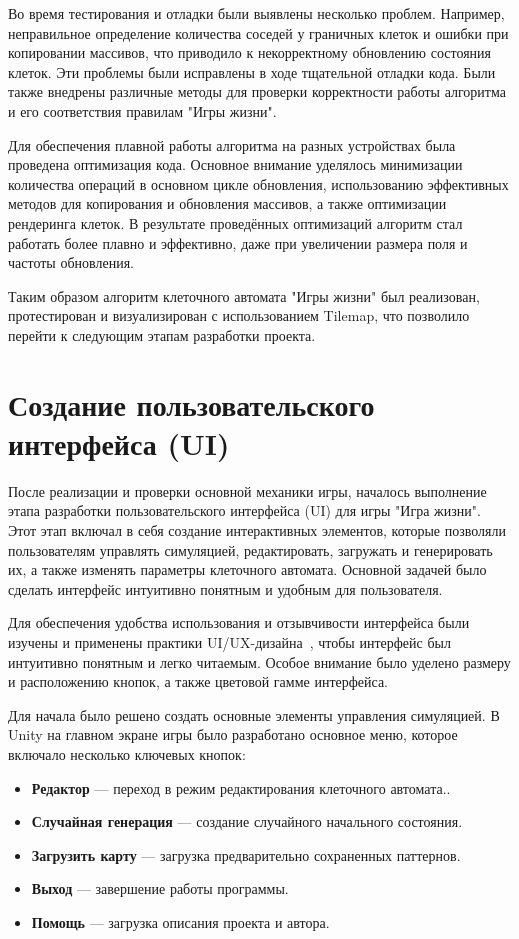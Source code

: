 Во время тестирования и отладки были выявлены несколько проблем. Например, неправильное определение количества соседей у граничных клеток и ошибки при копировании массивов, что приводило к некорректному обновлению состояния клеток. Эти проблемы были исправлены в ходе тщательной отладки кода. Были также внедрены различные методы для проверки корректности работы алгоритма и его соответствия правилам "Игры жизни".

Для обеспечения плавной работы алгоритма на разных устройствах была проведена оптимизация кода. Основное внимание уделялось минимизации количества операций в основном цикле обновления, использованию эффективных методов для копирования и обновления массивов, а также оптимизации рендеринга клеток. В результате проведённых оптимизаций алгоритм стал работать более плавно и эффективно, даже при увеличении размера поля и частоты обновления.

Таким образом алгоритм клеточного автомата "Игры жизни" был реализован, протестирован и визуализирован с использованием Tilemap, что позволило перейти к следующим этапам разработки проекта.

\section{\label{sec:ch02/sec01/sub03}Создание пользовательского интерфейса (UI)}

После реализации и проверки основной механики игры, началось выполнение этапа разработки пользовательского интерфейса (UI) для игры "Игра жизни". 
Этот этап включал в себя создание интерактивных элементов, которые позволяли пользователям управлять симуляцией, редактировать, загружать и генерировать их, а также изменять параметры клеточного автомата. Основной задачей было сделать интерфейс интуитивно понятным и удобным для пользователя.

Для обеспечения удобства использования и отзывчивости интерфейса были изучены и применены практики UI/UX-дизайна~\cite{UI/Ux}, чтобы интерфейс был интуитивно понятным и легко читаемым. Особое внимание было уделено размеру и расположению кнопок, а также цветовой гамме интерфейса.

Для начала было решено создать основные элементы управления симуляцией. В Unity на главном экране игры было разработано основное меню, которое включало несколько ключевых кнопок:
        \begin{itemize}
		\item \textbf{Редактор} --- переход в режим редактирования клеточного автомата..
		\item \textbf{Случайная генерация} --- создание случайного начального состояния. 
		\item\textbf{Загрузить карту} --- загрузка предварительно сохраненных паттернов. 
		\item \textbf{Выход} --- завершение работы программы.
            \item \textbf{Помощь} --- загрузка описания проекта и автора.
	\end{itemize}

